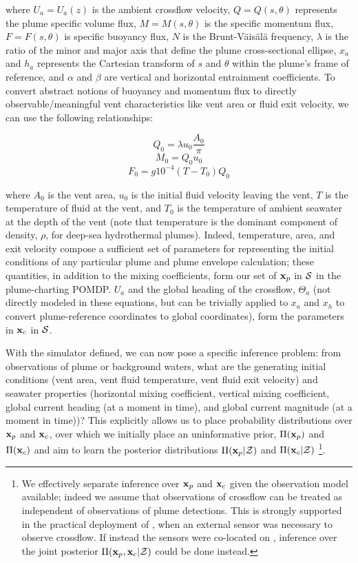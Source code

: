where $U_a = U_a(z)$ is the ambient crossflow velocity, $Q = Q(s,\theta)$ represents the plume specific volume flux, $M = M(s, \theta)$ is the specific momentum flux, $F = F(s, \theta)$ is specific buoyancy flux, $N$ is the Brunt-V\"ais\"al\"a frequency, $\lambda$ is the ratio of the minor and major axis that define the plume cross-sectional ellipse, $x_a$ and $h_a$ represents the Cartesian transform of $s$ and $\theta$ within the plume's frame of reference, and $\alpha$ and $\beta$ are vertical and horizontal entrainment coefficients. To convert abstract notions of buoyancy and momentum flux to directly observable/meaningful vent characteristics like vent area or fluid exit velocity, we can use the following relationships:

\begin{equation}
    Q_0 = \lambda u_0 \frac{A_0}{\pi}
\end{equation}
\begin{equation}
    M_0 = Q_0 u_0
\end{equation}
\begin{equation}
    F_0 = g10^{-4}(T-T_0)Q_0
\end{equation}

\noindent where $A_0$ is the vent area, $u_0$ is the initial fluid velocity leaving the vent, $T$ is the temperature of fluid at the vent, and $T_0$ is the temperature of ambient seawater at the depth of the vent (note that temperature is the dominant component of density, $\rho$, for deep-sea hydrothermal plumes). Indeed, temperature, area, and exit velocity compose a sufficient set of parameters for representing the initial conditions of any particular plume and plume envelope calculation; these quantities, in addition to the mixing coefficients, form our set of $\mathbf{x}_p$ in $\mathcal{S}$ in the plume-charting POMDP. $U_a$ and the global heading of the crossflow, $\Theta_a$ (not directly modeled in these equations, but can be trivially applied to $x_a$ and $x_h$ to convert plume-reference coordinates to global coordinates), form the parameters in $\mathbf{x}_c$ in $\mathcal{S}$.

With the simulator defined, we can now pose a specific inference problem: from observations of plume or background waters, what are the generating initial conditions (vent area, vent fluid temperature, vent fluid exit velocity) and seawater properties (horizontal mixing coefficient, vertical mixing coefficient, global current heading (at a moment in time), and global current magnitude (at a moment in time))? This explicitly allows us to place probability distributions over $\mathbf{x}_p$ and $\mathbf{x}_c$, over which we initially place an uninformative prior, $\Pi(\mathbf{x}_p)$ and $\Pi(\mathbf{x}_c)$ and aim to learn the posterior distributions $\Pi(\mathbf{x}_p | \mathcal{Z})$ and $\Pi(\mathbf{x}_c | \mathcal{Z})$ \footnote{We effectively separate inference over $\mathbf{x}_p$ and $\mathbf{x}_c$ given the observation model available; indeed we assume that observations of crossflow can be treated as independent of observations of plume detections. This is strongly supported in the practical deployment of \Sentry, when an external sensor was necessary to observe crossflow. If instead the sensors were co-located on \Sentry, inference over the joint posterior $\Pi(\mathbf{x}_p, \mathbf{x}_c | \mathcal{Z})$ could be done instead.}.

